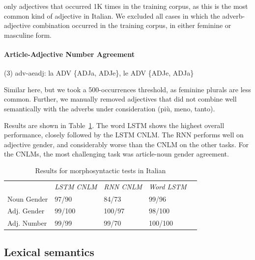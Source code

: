 only adjectives that occurred 1K times in the training corpus, as this is the most common kind of adjective in Italian.
We excluded all cases in which the adverb-adjective combination occurred in the training corpus, in either feminine or masculine form.

\paragraph{Article-Adjective Number Agreement}
(3) adv-aeadj: la ADV \{ADJa, ADJe\}, le ADV \{ADJe, ADJa\}

Similar here, but we took a 500-occurrences threshold, as feminine plurals are less common.
Further, we manually removed adjectives that did not combine well semantically with the adverbs under consideration (pi{\`u}, meno, tanto).


Results are shown in Table~\ref{tab:ital-agr-results}.
The word LSTM shows the highest overall performance, closely followed by the LSTM CNLM.
The RNN performs well on adjective gender, and considerably worse than the CNLM on the other tasks.
For the CNLMs, the most challenging task was article-noun gender agreement.



\begin{table}[t]
  \begin{center}
    \begin{tabular}{l|l|l|l|l}
      \multicolumn{1}{c}{}&\emph{LSTM CNLM}&\emph{RNN CNLM}&\emph{Word LSTM}\\
	    Noun Gender & 97/90  & 84/73 & 99/96 \\
	    Adj. Gender & 99/100 & 100/97 & 98/100 \\
	    Adj. Number & 99/99 & 99/70 & 100/100 \\
    \end{tabular}
  \end{center}
  \caption{\label{tab:ital-agr-results} Results for morphosyntactic tests in Italian}
\end{table}





%


\subsection{Lexical semantics}
\label{sec:semantics}

